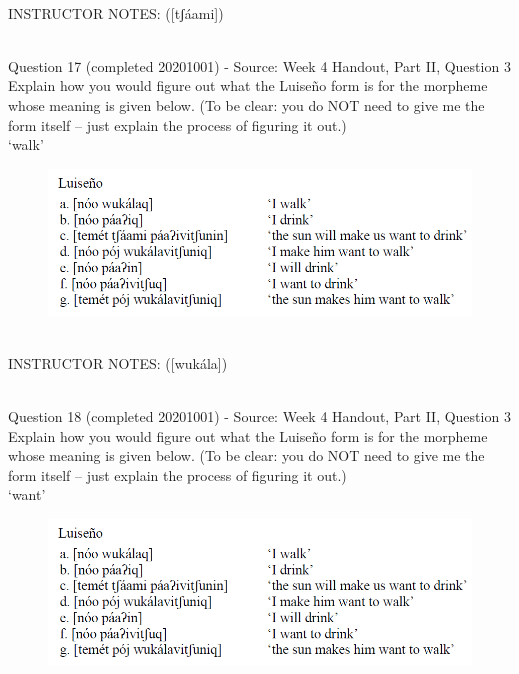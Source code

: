 \documentclass[12pt]{article}
\begin{document}
~\\
INSTRUCTOR NOTES: ([tʃáami])


~\\

{\large Question 17} (completed 20201001) - Source: Week 4 Handout, Part II, Question 3\\

Explain how you would figure out what the Luiseño form is for the morpheme whose meaning is given below. (To be clear: you do NOT need to give me the form itself -- just explain the process of figuring it out.)\\

‘walk’

\begin{figure}[H]
\includegraphics{../images/luiseno.png}
\end{figure}

~\\
INSTRUCTOR NOTES: ([wukála])


~\\

{\large Question 18} (completed 20201001) - Source: Week 4 Handout, Part II, Question 3\\

Explain how you would figure out what the Luiseño form is for the morpheme whose meaning is given below. (To be clear: you do NOT need to give me the form itself -- just explain the process of figuring it out.)\\

‘want’

\begin{figure}[H]
\includegraphics{../images/luiseno.png}
\end{figure}
\end{document}
